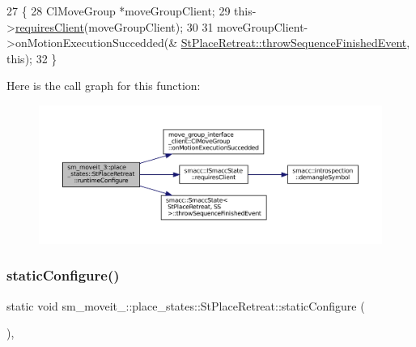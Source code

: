 \begin{DoxyCode}
27     \{
28         ClMoveGroup *moveGroupClient;
29         this->\hyperlink{classsmacc_1_1ISmaccState_a7f95c9f0a6ea2d6f18d1aec0519de4ac}{requiresClient}(moveGroupClient);
30 
31         moveGroupClient->onMotionExecutionSuccedded(&
      \hyperlink{classsmacc_1_1SmaccState_a49dcfc25824f7e083dd4b999c49ab2b6}{StPlaceRetreat::throwSequenceFinishedEvent}, \textcolor{keyword}{this});
32     \}
\end{DoxyCode}
Here is the call graph for this function\+:
\nopagebreak
\begin{figure}[H]
\begin{center}
\leavevmode
\includegraphics[width=350pt]{structsm__moveit__3_1_1place__states_1_1StPlaceRetreat_a47d0fe7bd6b1983682b143160b59a3c1_cgraph}
\end{center}
\end{figure}
\mbox{\label{structsm__moveit__3_1_1place__states_1_1StPlaceRetreat_a6491eb1f4a5ea2811323477c6acd8f9d}} 
\subsubsection{\texorpdfstring{static\+Configure()}{staticConfigure()}}
{\footnotesize\ttfamily static void sm\+\_\+moveit\+\_\+::place\+\_\+states\+::\+St\+Place\+Retreat\+::static\+Configure (\begin{DoxyParamCaption}{ }\end{DoxyParamCaption})\hspace{0.3cm}{\ttfamily [inline]}, {\ttfamily [static]}}



